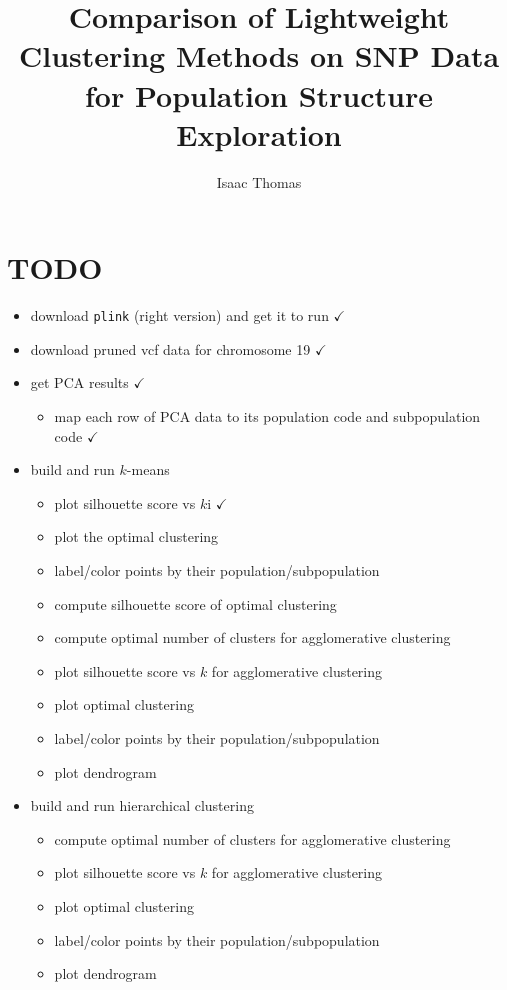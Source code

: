 \documentclass[letterpaper]{article}
\title{Comparison of Lightweight Clustering Methods on SNP Data for Population Structure Exploration}
\author{Isaac Thomas}
\newcommand{\code}[1]{\texttt{#1}}
\theoremstyle{definition}
\begin{document}
\maketitle

\section{TODO}
\begin{itemize}
    \item download \code{plink} (right version) and get it to run $\checkmark$
    \item download pruned vcf data for chromosome 19 $\checkmark$
    \item get PCA results $\checkmark$
        \begin{itemize}
            \item map each row of PCA data to its population code and subpopulation code $\checkmark$
        \end{itemize}
    \item build and run $k$-means
    \begin{itemize}
        \item plot silhouette score vs $k$i $\checkmark$
        \item plot the optimal clustering
        \item label/color points by their population/subpopulation
        \item compute silhouette score of optimal clustering
        \item compute optimal number of clusters for agglomerative clustering
        \item plot silhouette score vs $k$ for agglomerative clustering
        \item plot optimal clustering
        \item label/color points by their population/subpopulation
        \item plot dendrogram
    \end{itemize}
    \item build and run hierarchical clustering
    \begin{itemize}
        \item compute optimal number of clusters for agglomerative clustering
        \item plot silhouette score vs $k$ for agglomerative clustering
        \item plot optimal clustering
        \item label/color points by their population/subpopulation
        \item plot dendrogram
    \end{itemize}

\end{itemize}
\end{document}
